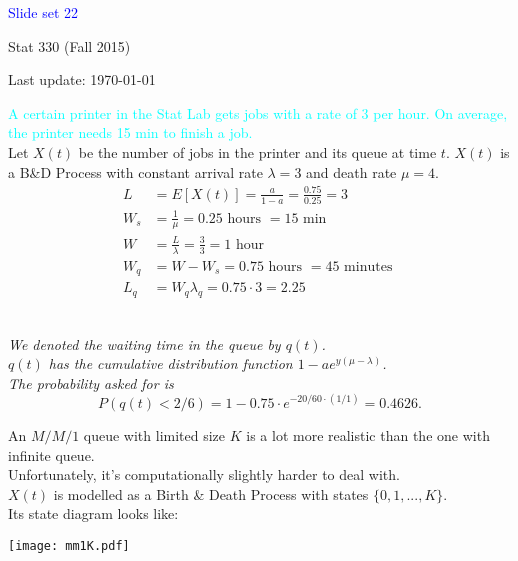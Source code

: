 \documentclass[20pt,landscape]{foils}
\newcommand{\no}{\noindent}
\begin{document}
\LogoOff


\foilhead[1.3in]{}
\centerline{\LARGE \textcolor{blue}{Slide set 22}}
\vspace{0.3in}
\centerline{\large Stat 330 (Fall 2015)}
\vspace{0.2in}
\centerline{\tiny Last update: \today}
\setcounter{page}{0}

\foilhead[-.8in]{\textcolor{blue}{The $M/M/1$ Queue: Example}}\vspace{0.3cm}
\no {\textcolor{magenta}{Printer Queue (continued)}} {\textcolor{cyan}{A certain printer in the Stat Lab gets jobs with a rate of 3 per hour. On average, the printer needs 15 min to finish a job.}}\\[.1in]
\no Let $X(t)$ be the number of jobs in the printer and its queue at time $t$. $X(t)$ is a B\&D Process with constant arrival rate $\lambda = 3$ and death rate $\mu = 4$.\\[.1in] 
{\small
  \begin{align*}
L &= E[X(t)] = \frac{a}{1-a} = \frac{0.75}{0.25} = 3 \\
W_s &= \frac{1}{\mu} = 0.25 \text{ hours } = 15 \text{ min } \\
W &= \frac{L}{\lambda} = \frac{3}{3} = 1 \text{ hour} \\
W_q &= W - W_s = 0.75 \text{ hours } = 45 \text{ minutes } \\
L_q &= W_q \lambda_q = 0.75 \cdot 3 = 2.25
\end{align*}}

\foilhead[-.8in]{\textcolor{blue}{The $M/M/1$ Queue: Example (cont'd)}}\vspace*{3mm}
\no {\textcolor{cyan}{On average, a job has to spend 45 min in the queue. What is the probability that a job has to spend less than 20 min in the queue?}}\\[.3in]
{\it 
\no We denoted the waiting time in the queue by $q(t)$. \\[.2in]
\no $q(t)$ has the cumulative distribution function $1 - a e^{y (\mu - \lambda)}$.\\[.2in]
\no The probability asked for is 
\[
P(q(t) < 2/6) = 1 - 0.75 \cdot e^{-20/60 \cdot (1/1)} = 0.4626.
\]
}

\foilhead[-.8in]{\textcolor{blue}{The $M/M/1/K$ queue}}\vspace*{.2in}
\no  An $M/M/1$ queue with limited size $K$ is a lot more realistic than the one with infinite queue. \\[.1in]
\no Unfortunately, it's computationally slightly harder to deal with.\\[.1in]
\no $X(t)$ is modelled as a Birth \& Death Process with states $\{0, 1, ..., K \}$.\\[.1in]
\no Its state diagram looks like:\\[.1in]
\centerline {\texttt{[image: mm1K.pdf]}}
\end{document}
